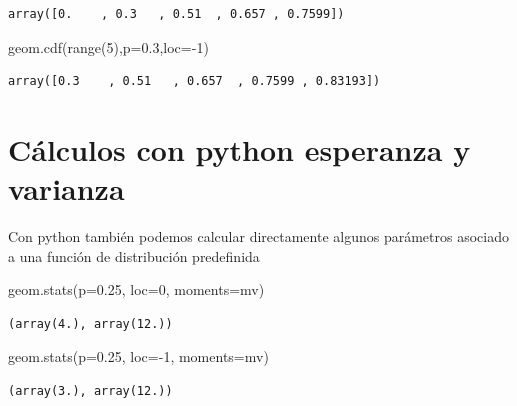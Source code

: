 \documentclass[
  letterpaper,
  DIV=11,
  numbers=noendperiod]{scrreprt}
\newenvironment{Shaded}{\begin{snugshade}}{\end{snugshade}}
\newcommand{\BuiltInTok}[1]{\textcolor[rgb]{0.00,0.23,0.31}{#1}}
\newcommand{\DecValTok}[1]{\textcolor[rgb]{0.68,0.00,0.00}{#1}}
\newcommand{\FloatTok}[1]{\textcolor[rgb]{0.68,0.00,0.00}{#1}}
\newcommand{\NormalTok}[1]{\textcolor[rgb]{0.00,0.23,0.31}{#1}}
\newcommand{\OperatorTok}[1]{\textcolor[rgb]{0.37,0.37,0.37}{#1}}
\newcommand{\StringTok}[1]{\textcolor[rgb]{0.13,0.47,0.30}{#1}}
\begin{document}
\begin{verbatim}
array([0.    , 0.3   , 0.51  , 0.657 , 0.7599])
\end{verbatim}

\begin{Shaded}
\begin{Highlighting}[]
\NormalTok{geom.cdf(}\BuiltInTok{range}\NormalTok{(}\DecValTok{5}\NormalTok{),p}\OperatorTok{=}\FloatTok{0.3}\NormalTok{,loc}\OperatorTok{={-}}\DecValTok{1}\NormalTok{)}
\end{Highlighting}
\end{Shaded}

\begin{verbatim}
array([0.3    , 0.51   , 0.657  , 0.7599 , 0.83193])
\end{verbatim}

\section{Cálculos con python esperanza y
varianza}\label{cuxe1lculos-con-python-esperanza-y-varianza}

Con python también podemos calcular directamente algunos parámetros
asociado a una función de distribución predefinida

\begin{Shaded}
\begin{Highlighting}[]
\NormalTok{geom.stats(p}\OperatorTok{=}\FloatTok{0.25}\NormalTok{, loc}\OperatorTok{=}\DecValTok{0}\NormalTok{, moments}\OperatorTok{=}\StringTok{\textquotesingle{}mv\textquotesingle{}}\NormalTok{)}
\end{Highlighting}
\end{Shaded}

\begin{verbatim}
(array(4.), array(12.))
\end{verbatim}

\begin{Shaded}
\begin{Highlighting}[]
\NormalTok{geom.stats(p}\OperatorTok{=}\FloatTok{0.25}\NormalTok{, loc}\OperatorTok{={-}}\DecValTok{1}\NormalTok{, moments}\OperatorTok{=}\StringTok{\textquotesingle{}mv\textquotesingle{}}\NormalTok{)}
\end{Highlighting}
\end{Shaded}

\begin{verbatim}
(array(3.), array(12.))
\end{verbatim}
\end{document}
